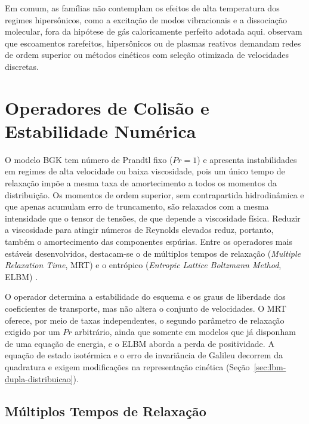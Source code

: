 Em comum, as famílias não contemplam os efeitos de alta temperatura dos regimes hipersônicos, como a excitação de modos vibracionais e a dissociação molecular, fora da hipótese de gás caloricamente perfeito adotada aqui.
\textcite{Guo2020} observam que escoamentos rarefeitos, hipersônicos ou de plasmas reativos demandam redes de ordem superior ou métodos cinéticos com seleção otimizada de velocidades discretas.


\section{Operadores de Colisão e Estabilidade Numérica}\label{sec:lbm-colisao}

O modelo BGK tem número de Prandtl fixo ($Pr = 1$) e apresenta instabilidades em regimes de alta velocidade ou baixa viscosidade, pois um único tempo de relaxação impõe a mesma taxa de amortecimento a todos os momentos da distribuição.
Os momentos de ordem superior, sem contrapartida hidrodinâmica e que apenas acumulam erro de truncamento, são relaxados com a mesma intensidade que o tensor de tensões, de que depende a viscosidade física.
Reduzir a viscosidade para atingir números de Reynolds elevados reduz, portanto, também o amortecimento das componentes espúrias.
Entre os operadores mais estáveis desenvolvidos, destacam-se o de múltiplos tempos de relaxação (\textit{Multiple Relaxation Time}, MRT) e o entrópico (\textit{Entropic Lattice Boltzmann Method}, ELBM) \parencite{Chen1998}.

O operador determina a estabilidade do esquema e os graus de liberdade dos coeficientes de transporte, mas não altera o conjunto de velocidades.
O MRT oferece, por meio de taxas independentes, o segundo parâmetro de relaxação exigido por um $Pr$ arbitrário, ainda que somente em modelos que já disponham de uma equação de energia, e o ELBM aborda a perda de positividade.
A equação de estado isotérmica e o erro de invariância de Galileu decorrem da quadratura e exigem modificações na representação cinética (Seção~\ref{sec:lbm-dupla-distribuicao}).


\subsection{Múltiplos Tempos de Relaxação}\label{subsec:lbm-mrt}

